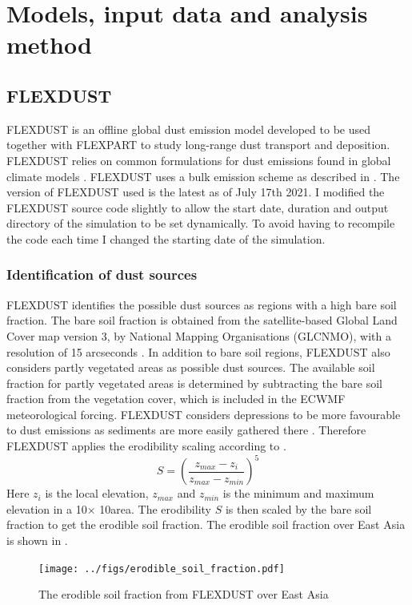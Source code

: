 \chapter{Models, input data and analysis method}\label{chap:methods}

\section{FLEXDUST}\label{sec:flexdust}
FLEXDUST is an offline global dust emission model developed to be used together 
with FLEXPART to study long-range dust transport and deposition. FLEXDUST relies on common 
formulations for dust emissions found in global climate models \parencite{flexdust_ref_2016}.
FLEXDUST uses a bulk emission scheme as described in .
The version of FLEXDUST used is the latest as of July 17th 2021. 
I modified the FLEXDUST source code slightly to allow the start date, duration and output directory of the simulation to be set dynamically. 
To avoid having to recompile the code each time I changed the starting date of the simulation.  

\subsection{Identification of dust sources}
FLEXDUST identifies the possible dust sources as regions with a high bare soil fraction. 
The bare soil fraction is obtained from the satellite-based Global Land Cover map version 3, by National Mapping Organisations (GLCNMO), with a 
resolution of 15 arcseconds \parencite{shirahata2017production}.
In addition to bare soil regions, FLEXDUST also considers partly vegetated areas as possible
dust sources. The available soil fraction for partly vegetated areas is determined by
subtracting the bare soil fraction from the vegetation cover, which is included in the ECWMF meteorological forcing.
FLEXDUST considers depressions to be more favourable to dust emissions as sediments are more easily gathered there \parencite{zender2003mineral}. Therefore FLEXDUST applies the erodibility scaling 
 according to \textcite{dust_dist_Ginoux2001}. 
\begin{equation}\label{eq_ero_soil_frac}
    S = \left(\frac{z_{max} - z_i}{z_{max} - z_{min}}\right)^5 
\end{equation}    
Here $z_i$ is the local elevation, $z_{max}$ and $z_{min}$ is the minimum and
maximum elevation in a 10\degree $\times$ 10\degree area.  The erodibility $S$ is
then scaled by the bare soil fraction to get the erodible soil fraction. The erodible soil fraction over East Asia is shown in . 
\begin{figure}[hptb]
    \centering
    \texttt{[image: ../figs/erodible\_soil\_fraction.pdf]}
    \caption{The erodible soil fraction from FLEXDUST over East Asia}
    \label{fig:erodible_soil_fraction_EA}
\end{figure}
